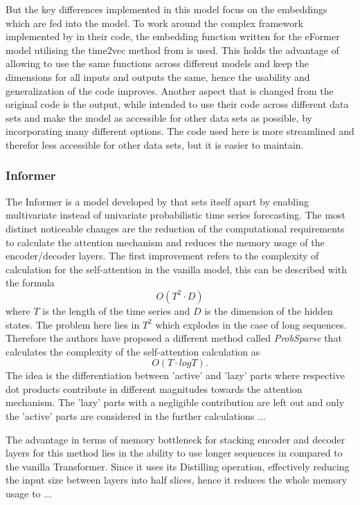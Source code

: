 \documentclass{article}
\begin{document}
But the key differences implemented in this model focus on the embeddings which are fed into the model. To work around the complex framework implemented by \cite{autoformer} in their code, the embedding function written for the eFormer model utilising the time2vec method from \cite{time2vec} is used. This holds the advantage of allowing to use the same functions across different models and keep the dimensions for all inputs and outputs the same, hence the usability and generalization of the code improves. Another aspect that is changed from the original code is the output, while \cite{autoformer} intended to use their code across different data sets and make the model as accessible for other data sets as possible, by incorporating many different options. The code used here is more streamlined and therefor less accessible for other data sets, but it is easier to maintain. 

\subsubsection{Informer}

The Informer is a model developed by \cite{Informer} that sets itself apart by enabling multivariate instead of univariate probabilistic time series forecasting. The most distinct noticeable changes are the reduction of the computational requirements to calculate the attention mechanism and reduces the memory usage of the encoder/decoder layers. The first improvement refers to the complexity of calculation for the self-attention in the vanilla model, this can be described with the formula
\begin{equation*}
    O(T^2 \cdot D)
\end{equation*}
where $T$ is the length of the time series and $D$ is the dimension of the hidden states. The problem here lies in $T^2$ which explodes in the case of long sequences. Therefore the authors have proposed a different method called \textit{ProbSparse} that calculates the complexity of the self-attention calculation as
\begin{equation*}
    O(T \cdot log{T}) .
\end{equation*}
The idea is the differentiation between 'active' and 'lazy' parts where respective dot products contribute in different magnitudes towards the attention mechanism. The 'lazy' parts with a negligible contribution are left out and only the 'active' parts are considered in the further calculations ...

The advantage in terms of memory bottleneck for stacking encoder and decoder layers for this method lies in the ability to use longer sequences in compared to the vanilla Transformer. Since it uses its Distilling operation, effectively reducing the input size between layers into half slices, hence it reduces the whole memory usage to ...
    
\end{document}

